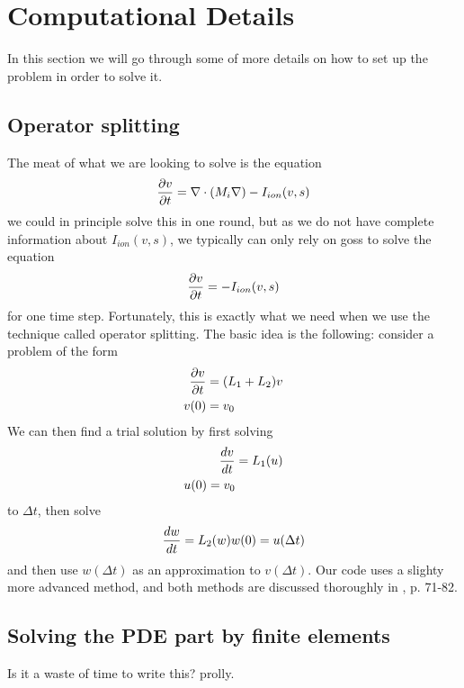 \section{Computational Details}
In this section we will go through some of more details on how to set up the problem in order to solve it.  
\subsection{Operator splitting}
The meat of what we are looking to solve is the equation
\begin{equation}
 {\partial v \over \partial t} = \nabla \cdot (M_i \nabla) - I_{ion} (v,s)
\end{equation}
we could in principle solve this in one round, but as we do not have complete information about $I_{ion}(v,s)$, we typically can only rely on goss to solve the equation 
\begin{equation}
 {\partial v \over \partial t} = -I_{ion}(v,s)
\end{equation}
for one time step. Fortunately, this is exactly what we need when we use the technique called operator splitting. The basic idea is the following: consider a problem of the form 
\begin{align}
 {\partial v \over \partial t} &= (L_1 + L_2)v \\
 v(0) &= v_0
\end{align}
We can then find a trial solution by first solving 
\begin{align}
 {dv\over dt} &= L_1(u) \\
 u(0) = v_0
\end{align}
to $\Delta t$, then solve 
\begin{align}
 {dw \over dt} = L_2(w)
 w(0)  = u(\Delta t)
\end{align}
and then use $w(\Delta t)$ as an approximation to $v(\Delta t)$. Our code uses a slighty more advanced method, and both methods are discussed thoroughly in \cite{Sundnes06}, p. 71-82.

\subsection{Solving the PDE part by finite elements}
Is it a waste of time to write this? prolly. 